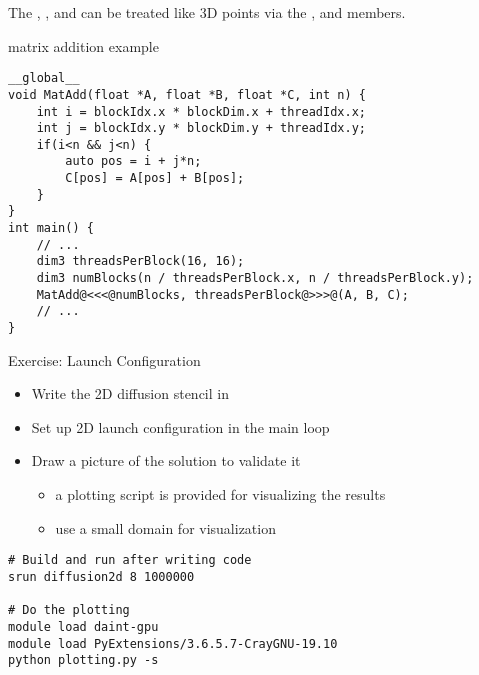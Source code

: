 \documentclass[aspectratio=43]{beamer}
\begin{document}
\begin{frame}[fragile]{}

    The , ,  and  can be treated like 3D points via the ,  and  members.
    \begin{code}{matrix addition example}
        \begin{lstlisting}[style=boxcudatiny]
__global__
void MatAdd(float *A, float *B, float *C, int n) {
    int i = blockIdx.x * blockDim.x + threadIdx.x;
    int j = blockIdx.y * blockDim.y + threadIdx.y;
    if(i<n && j<n) {
        auto pos = i + j*n;
        C[pos] = A[pos] + B[pos];
    }
}
int main() {
    // ...
    dim3 threadsPerBlock(16, 16);
    dim3 numBlocks(n / threadsPerBlock.x, n / threadsPerBlock.y);
    MatAdd@<<<@numBlocks, threadsPerBlock@>>>@(A, B, C);
    // ...
}
        \end{lstlisting}
   \end{code}

\end{frame}

\begin{frame}[fragile]{Exercise: Launch Configuration}
    \begin{itemize}
        \item Write the 2D diffusion stencil in 
        \item Set up 2D launch configuration in the main loop
        \item Draw a picture of the solution to validate it
        \begin{itemize}
            \item a plotting script is provided for visualizing the results
            \item use a small domain for visualization
        \end{itemize}
    \end{itemize}

    \begin{terminal}{}
        \begin{lstlisting}[style=terminal]
# Build and run after writing code
srun diffusion2d 8 1000000

# Do the plotting
module load daint-gpu
module load PyExtensions/3.6.5.7-CrayGNU-19.10
python plotting.py -s
        \end{lstlisting}
    \end{terminal}
\end{frame}
\end{document}
